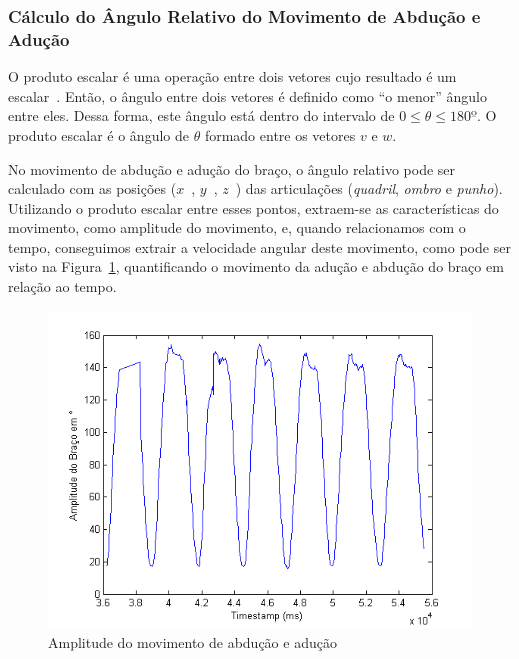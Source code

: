 \subsubsection{Cálculo do Ângulo Relativo do Movimento de Abdução e Adução}\label{section:movimento_abducao}
O produto escalar é uma operação entre dois vetores cujo resultado é um escalar~\cite{algebra2000}. Então, o ângulo entre dois vetores é definido como ``o menor'' ângulo entre eles. Dessa forma, este ângulo está dentro do intervalo de $0 \leq \theta \leq 180º $. O produto escalar é o ângulo de $ \theta$ formado entre os vetores $ v $ e $ w $.


% 
% 

No movimento de abdução e adução do braço, o ângulo relativo pode ser calculado com as posições ($ x $\ ,  $ y $\ , $ z $\ ) das articulações (\textit{quadril}, \textit{ombro} e \textit{punho}). Utilizando o produto escalar entre esses pontos, extraem-se as características do movimento, como amplitude do movimento, e, quando relacionamos com o tempo, conseguimos extrair a velocidade angular deste movimento, como pode ser visto na Figura~\ref{img:amplitude_braco}, quantificando o movimento da adução e abdução do braço em relação ao tempo.


\begin{figure}[!htb]
     \centering
     \includegraphics[width=1\textwidth]{./img/amplitude-braco.png}
     \caption{Amplitude do movimento de abdução e adução}
     \label{img:amplitude_braco}
\end{figure}

